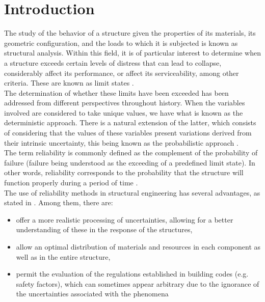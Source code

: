 
\chapter{Introduction}
\label{ch:1}

The study of the behavior of a structure given the properties of its materials, its geometric configuration, and the loads to which it is subjected is known as structural analysis. Within this field, it is of particular interest to determine when a structure exceeds certain levels of distress that can lead to collapse, considerably affect its performance, or affect its serviceability, among other criteria. These are known as limit states \citep{Melchers2018}. \\

The determination of whether these limits have been exceeded has been addressed from different perspectives throughout history. When the variables involved are considered to take unique values, we have what is known as the deterministic approach. There is a natural extension of the latter, which consists of considering that the values of these variables present variations derived from their intrinsic uncertainty, this being known as the probabilistic approach \citep{Ditlevsen1996}. \\

The term reliability is commonly defined as the complement of the probability of failure (failure being understood as the exceeding of a predefined limit state). In other words, reliability corresponds to the probability that the structure will function properly during a period of time \citep{Melchers2018}. \\

The use of reliability methods in structural engineering has several advantages, as stated in \citep{Lemaire2009}. Among them, there are:

\begin{itemize}
    \item offer a more realistic processing of uncertainties, allowing for a better understanding of these in the response of the structures, 
    \item allow an optimal distribution of materials and resources in each component as well as in the entire structure,
    \item permit the evaluation of the regulations established in building codes (e.g. safety factors), which can sometimes appear arbitrary due to the ignorance of the uncertainties associated with the phenomena
\end{itemize}

